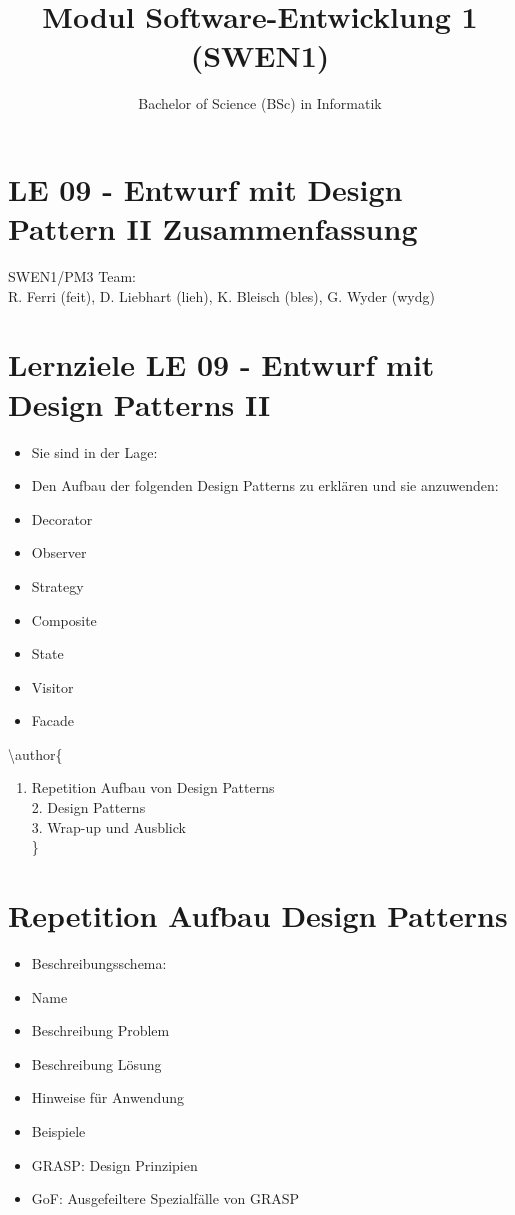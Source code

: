 \documentclass[10pt]{article}
\title{Modul Software-Entwicklung 1 (SWEN1) }
\author{Bachelor of Science (BSc) in Informatik}
\date{}
\begin{document}
\maketitle


\section*{LE 09 - Entwurf mit Design Pattern II Zusammenfassung}
SWEN1/PM3 Team:\\
R. Ferri (feit), D. Liebhart (lieh), K. Bleisch (bles), G. Wyder (wydg)

\section*{Lernziele LE 09 - Entwurf mit Design Patterns II}
\begin{itemize}
  \item Sie sind in der Lage:
  \item Den Aufbau der folgenden Design Patterns zu erklären und sie anzuwenden:
  \item Decorator
  \item Observer
  \item Strategy
  \item Composite
  \item State
  \item Visitor
  \item Facade
\end{itemize}

\textbackslash author\{

\begin{enumerate}
  \item Repetition Aufbau von Design Patterns \\
 2. Design Patterns \\
 3. Wrap-up und Ausblick\\
\}
\end{enumerate}

\section*{Repetition Aufbau Design Patterns}
\begin{itemize}
  \item Beschreibungsschema:
  \item Name
  \item Beschreibung Problem
  \item Beschreibung Lösung
  \item Hinweise für Anwendung
  \item Beispiele
  \item GRASP: Design Prinzipien
  \item GoF: Ausgefeiltere Spezialfälle von GRASP
\end{itemize}
\end{document}
